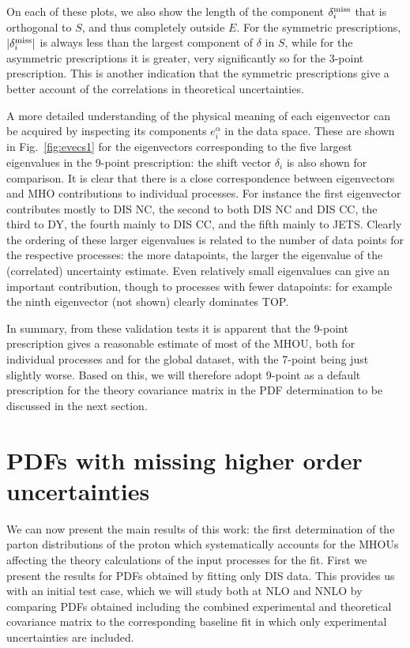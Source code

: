 On each of these plots, we also show the length of the component 
$\delta^{\rm miss}_i$ that is orthogonal to $S$, and thus completely outside $E$. For the symmetric prescriptions, $|\delta^{\rm miss}_i|$ is always less than the largest component of $\delta$ in $S$, while for the asymmetric prescriptions it is greater, very significantly so for the 3-point prescription. This is another indication that the symmetric prescriptions give a better account of the correlations in theoretical uncertainties. 

A more detailed understanding of the physical meaning of each
eigenvector can be acquired by inspecting its components $e_i^\alpha$ in the data space. These are shown in Fig.~\ref{fig:evecs1} for the
eigenvectors corresponding to the five largest eigenvalues in the
9-point prescription: the shift vector $\delta_i$ is also shown for comparison.
%
It is clear that there is a close correspondence between eigenvectors
and MHO contributions to individual processes. For instance the first
eigenvector contributes mostly to DIS NC, the second to both DIS NC and DIS CC, the third to DY, the fourth mainly to DIS CC, and the fifth mainly to JETS. Clearly the ordering of these larger eigenvalues is related to the number of data points for the respective processes: the more datapoints, the larger the eigenvalue of the (correlated) uncertainty estimate. Even relatively small eigenvalues can give an important contribution, though to processes with fewer datapoints: for example the ninth eigenvector (not shown) clearly dominates TOP.

In summary, from these validation tests it is apparent that the 9-point
prescription gives a reasonable estimate of most of the MHOU, both for individual processes and for the global dataset, with the 7-point being just slightly
worse. Based on this, we will therefore adopt 9-point as a default prescription
for the theory covariance matrix in the PDF determination to be discussed in 
the next section.

\section{PDFs with missing higher order uncertainties}
\label{sec:fitstherr}

We can now present the main results of this work: the
first determination of the parton distributions of the proton
which systematically accounts for the MHOUs affecting the theory
calculations of the input processes for the fit.
%
First  we present the results for PDFs obtained by 
fitting only DIS data. This provides us with an initial test case, which we
will study both at NLO and NNLO by comparing PDFs obtained including
the combined experimental and theoretical covariance matrix to
the corresponding baseline fit in which only experimental
uncertainties are included.

